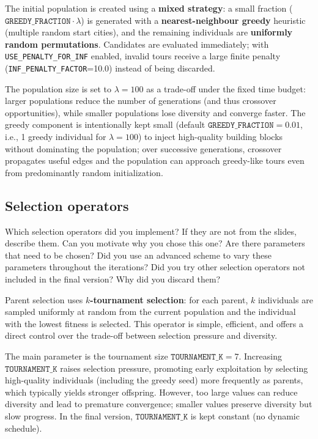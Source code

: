 \documentclass[a4paper,10pt]{article}
\newcommand{\ReplaceMe}[1]{{\color{blue}#1}}
\begin{document}
The initial population is created using a \textbf{mixed strategy}: a small fraction
($\texttt{GREEDY\_FRACTION}\cdot \lambda$) is generated with a \textbf{nearest-neighbour greedy}
heuristic (multiple random start cities), and the remaining individuals are \textbf{uniformly random
permutations}. Candidates are evaluated immediately; with \texttt{USE\_PENALTY\_FOR\_INF} enabled, invalid tours receive a large finite penalty (\texttt{INF\_PENALTY\_FACTOR}=10.0) instead of being discarded.

The population size is set to $\lambda=100$ as a trade-off under the fixed time budget: larger populations reduce the number of generations (and thus crossover opportunities), while smaller populations lose diversity and converge faster. The greedy component is intentionally kept small (default $\texttt{GREEDY\_FRACTION}=0.01$, i.e., 1 greedy individual for $\lambda=100$) to inject high-quality building blocks without dominating the population; over successive generations, crossover propagates useful edges and the population can approach greedy-like tours even from predominantly random initialization.

\subsection{Selection operators}

\ReplaceMe{Which selection operators did you implement? If they are not from the slides, describe them. Can you motivate why you chose this one? Are there parameters that need to be chosen? Did you use an advanced scheme to vary these parameters throughout the iterations? Did you try other selection operators not included in the final version? Why did you discard them?}

Parent selection uses \textbf{$k$-tournament selection}: for each parent, $k$ individuals are sampled uniformly at random from the current population and the individual with the lowest fitness is selected. This operator is simple, efficient, and offers a direct control over the trade-off between selection pressure and diversity.

The main parameter is the tournament size $\texttt{TOURNAMENT\_K}=7$. Increasing $\texttt{TOURNAMENT\_K}$ raises selection pressure, promoting early exploitation by selecting high-quality individuals (including the greedy seed) more frequently as parents, which typically yields stronger offspring. However, too large values can reduce diversity and lead to premature convergence; smaller values preserve diversity but slow progress. In the final version, $\texttt{TOURNAMENT\_K}$ is kept constant (no dynamic schedule).
\end{document}
